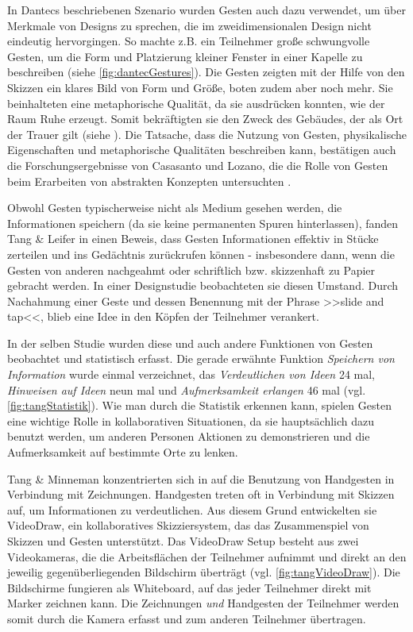 \medskip In Dantecs beschriebenen Szenario wurden Gesten auch dazu verwendet, um über Merkmale von Designs zu sprechen, die im zweidimensionalen Design nicht eindeutig hervorgingen. So machte z.B. ein Teilnehmer große schwungvolle Gesten, um die Form und Platzierung kleiner Fenster in einer Kapelle zu beschreiben (siehe \autoref{fig:dantecGestures}). Die Gesten zeigten mit der Hilfe von den Skizzen ein klares Bild von Form und Größe, boten zudem aber noch mehr. Sie beinhalteten eine metaphorische Qualität, da sie ausdrücken konnten, wie der Raum Ruhe erzeugt. Somit bekräftigten sie den Zweck des Gebäudes, der als Ort der Trauer gilt (siehe ). Die Tatsache, dass die Nutzung von Gesten, physikalische Eigenschaften und metaphorische Qualitäten beschreiben kann, bestätigen auch die Forschungsergebnisse von Casasanto und Lozano, die die Rolle von Gesten beim Erarbeiten von abstrakten Konzepten untersuchten \citep{Casasanto:2006}.

\medskip Obwohl Gesten typischerweise nicht als Medium gesehen werden, die Informationen speichern (da sie keine permanenten Spuren hinterlassen), fanden Tang \& Leifer in \citep{Tang:1988p279} einen Beweis, dass Gesten Informationen effektiv in Stücke zerteilen und ins Gedächtnis zurückrufen können - insbesondere dann, wenn die Gesten von anderen nachgeahmt oder schriftlich bzw. skizzenhaft zu Papier gebracht werden. In einer Designstudie beobachteten sie diesen Umstand. Durch Nachahmung einer Geste und dessen Benennung mit der Phrase >>slide and tap<<, blieb eine Idee in den Köpfen der Teilnehmer verankert.

\medskip In der selben Studie wurden diese und auch andere Funktionen von Gesten beobachtet und statistisch erfasst. Die gerade erwähnte Funktion \emph{Speichern von Information} wurde einmal verzeichnet, das \emph{Verdeutlichen von Ideen} 24 mal, \emph{Hinweisen auf Ideen} neun mal und \emph{Aufmerksamkeit erlangen} 46 mal (vgl. \autoref{fig:tangStatistik}). Wie man durch die Statistik erkennen kann, spielen Gesten eine wichtige Rolle in kollaborativen Situationen, da sie hauptsächlich dazu benutzt werden, um anderen Personen Aktionen zu demonstrieren und die Aufmerksamkeit auf bestimmte Orte zu lenken.

\medskip {} Tang \& Minneman konzentrierten sich in \citep{Tang:1991p28} auf die Benutzung von Handgesten in Verbindung mit Zeichnungen. Handgesten treten oft in Verbindung mit Skizzen auf, um Informationen zu verdeutlichen. Aus diesem Grund entwickelten sie VideoDraw, ein kollaboratives Skizziersystem, das das Zusammenspiel von Skizzen und Gesten unterstützt. Das VideoDraw Setup besteht aus zwei Videokameras, die die Arbeitsflächen der Teilnehmer aufnimmt und direkt an den jeweilig gegenüberliegenden Bildschirm überträgt (vgl. \autoref{fig:tangVideoDraw}). Die Bildschirme fungieren als Whiteboard, auf das jeder Teilnehmer direkt mit Marker zeichnen kann. Die Zeichnungen \emph{und} Handgesten der Teilnehmer werden somit durch die Kamera erfasst und zum anderen Teilnehmer übertragen.

